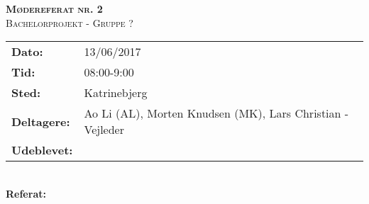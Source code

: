 
\newcommand{\HRule}{\rule{\linewidth}{0.1mm}}


	\begin{center}
		{\huge \bfseries \textsc{Mødereferat nr. 2}}\\
		\textsc{\large Bachelorprojekt - Gruppe ?}\\[0.3cm]
	\end{center}
	\begin{tabular}{ll}
	\large \textbf{Dato:} & 13/06/2017  	\\ %
	\large \textbf{Tid:}  & 08:00-9:00 	\\ %
	\large \textbf{Sted:} & Katrinebjerg		\\ %
	\large \textbf{Deltagere:} & Ao Li (AL), Morten Knudsen (MK), Lars Christian - Vejleder \\
	\large \textbf{Udeblevet:}
	\end{tabular}\\
	\phantom{\,}\hspace{0.1em} \large \textbf{Referat:}
